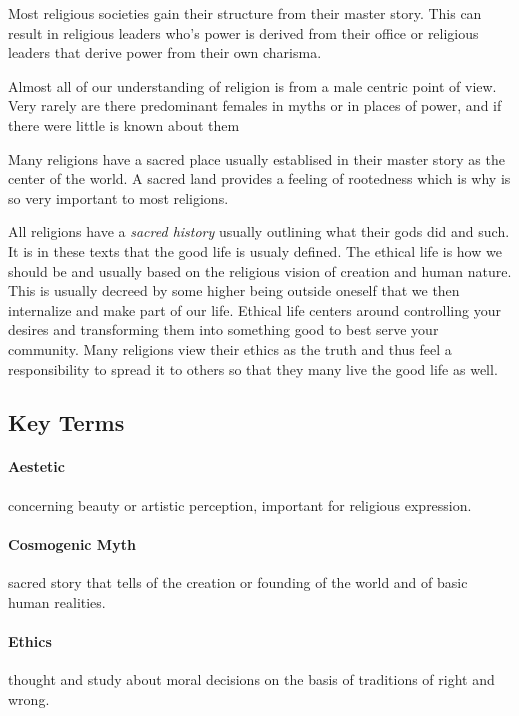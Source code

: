\documentclass{article}
\begin{document}
Most religious societies gain their structure from their master story. This can result in religious leaders who's power is derived from their office or religious leaders that derive power from their own charisma.

Almost all of our understanding of religion is from a male centric point of view. Very rarely are there predominant females in myths or in places of power, and if there were little is known about them

Many religions have a sacred place usually establised in their master story as the center of the world. A sacred land provides a feeling of rootedness which is why is so very important to most religions.

All religions have a \emph{sacred history} usually outlining what their gods did and such. It is in these texts that the good life is usualy defined. The ethical life is how we should be and usually based on the religious vision of creation and human nature. This is usually decreed by some higher being outside oneself that we then internalize and make part of our life. Ethical life centers around controlling your desires and transforming them into something good to best serve your community. Many religions view their ethics as the truth and thus feel a responsibility to spread it to others so that they many live the good life as well.

\subsection{Key Terms}
\label{sub:key_terms}
\paragraph{Aestetic}
\label{par:aestetic}
concerning beauty or artistic perception, important for religious expression.

\paragraph{Cosmogenic Myth}
\label{par:cosmogenic_myth}
sacred story that tells of the creation or founding of the world and of basic human realities.

\paragraph{Ethics}
\label{par:ethics}
thought and study about moral decisions on the basis of traditions of right and wrong.
\end{document}
